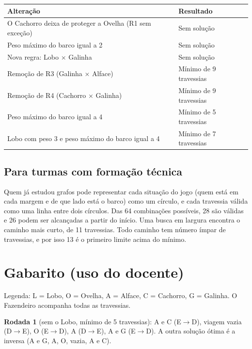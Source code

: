 \documentclass[12pt,a4paper]{article}
\begin{document}
\begin{center}
\renewcommand{\arraystretch}{1.1}
\small
\begin{tabular}{@{}>{\raggedright\arraybackslash}p{9.5cm}>{\raggedright\arraybackslash}p{4.5cm}@{}}
\toprule
\textbf{Alteração} & \textbf{Resultado} \\
\midrule
O Cachorro deixa de proteger a Ovelha (R1 sem exceção) & Sem solução \\
Peso máximo do barco igual a 2 & Sem solução \\
Nova regra: Lobo $\times$ Galinha & Sem solução \\
Remoção de R3 (Galinha $\times$ Alface) & Mínimo de 9 travessias \\
Remoção de R4 (Cachorro $\times$ Galinha) & Mínimo de 9 travessias \\
Peso máximo do barco igual a 4 & Mínimo de 5 travessias \\
Lobo com peso 3 e peso máximo do barco igual a 4 & Mínimo de 7 travessias \\
\bottomrule
\end{tabular}
\end{center}

\subsection{Para turmas com formação técnica}

Quem já estudou grafos pode representar cada situação do jogo (quem está em cada
margem e de que lado está o barco) como um círculo, e cada travessia válida como
uma linha entre dois círculos. Das 64 combinações possíveis, 28 são válidas e 26
podem ser alcançadas a partir do início. Uma busca em largura \cite{russell2020}
encontra o caminho mais curto, de 11 travessias. Todo caminho tem número
ímpar de travessias, e por isso 13 é o primeiro limite acima do mínimo.

\section{Gabarito (uso do docente)}

Legenda: L = Lobo, O = Ovelha, A = Alface, C = Cachorro, G = Galinha. O
Fazendeiro acompanha todas as travessias.

\textbf{Rodada 1} (sem o Lobo, mínimo de 5 travessias): A e C (E$\rightarrow$D),
viagem vazia (D$\rightarrow$E), O (E$\rightarrow$D), A (D$\rightarrow$E), A e G
(E$\rightarrow$D). A outra solução ótima é a inversa (A e G, A, O, vazia, A e C).
\end{document}
